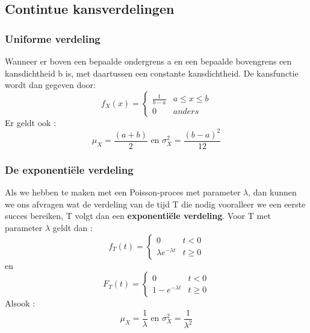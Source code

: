 \documentclass{report}
\begin{document}
	  		\subsection{Contintue kansverdelingen}
	  			\subsubsection{Uniforme verdeling}
	  				Wanneer er boven een bepaalde ondergrens a en een bepaalde bovengrens een kansdichtheid b is, met daartussen een constante kansdichtheid. De kansfunctie wordt dan gegeven door: 
	  				\[f_X(x) = \begin{cases} 
	  				\frac{1}{b - a} & a \leq x\leq b \\
	  				0 & anders
	  				\end{cases}
	  				\]
	  				Er geldt ook : 
	  				\[	\mu_X = \frac{(a+b)}{2} \textrm{ en } \sigma_X^2 = \frac{(b - a)^2}{12}\]
	  			\subsubsection{De exponentiële verdeling}
	  				Als we hebben te maken met een Poisson-proces met parameter \(\lambda\), dan kunnen we ons afvragen wat de verdeling van de tijd T die nodig vooralleer we een eerste succes bereiken, T volgt dan een \textbf{exponentiële verdeling}. Voor T met parameter \(\lambda\) geldt dan : 
	  				\[f_T(t) = \begin{cases}
	  					0 & t < 0 \\
	  					\lambda e^{-\lambda t} & t \geq 0
	  				\end{cases}\]
	  				en 
	  				\[F_T(t) = \begin{cases}
	  				0 & t < 0 \\
	  				1 - e^{-\lambda t} & t \geq 0
	  				\end{cases}\]
	  				Alsook : 
	  				\[	\mu_X = \frac{1}{\lambda} \textrm{ en } \sigma_X^2 = \frac{1}{\lambda^2}\]
	  		
\end{document}
